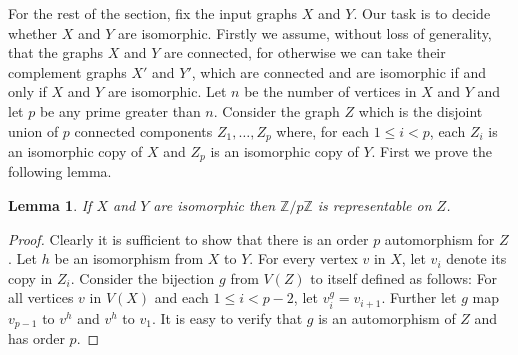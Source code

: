 \documentclass[a4paper,11pt]{article}
\newtheorem{lemma}[theorem]{Lemma}
\newcommand{\pcyc}{\mathbb{Z}/p\mathbb{Z}}
\begin{document}
For the rest of the section, fix the input graphs $X$ and $Y$. Our
task is to decide whether $X$ and $Y$ are isomorphic.  Firstly we
assume, without loss of generality, that the graphs $X$ and $Y$ are
connected, for otherwise we can take their complement graphs $X'$ and
$Y'$, which are connected and are isomorphic if and only if $X$ and
$Y$ are isomorphic. Let $n$ be the number of vertices in $X$ and $Y$
and let $p$ be any prime greater than $n$. Consider the graph $Z$
which is the disjoint union of $p$ connected components
$Z_1,\ldots,Z_p$ where, for each $1 \leq i < p$, each $Z_i$ is an
isomorphic copy of $X$ and $Z_p$ is an isomorphic copy of $Y$. First
we prove the following lemma.

\begin{lemma}\label{lem-gigrepf}
  If $X$ and $Y$ are isomorphic then $\pcyc$ is representable
  on $Z$.
\end{lemma}
\begin{proof}
  Clearly it is sufficient to show that there is an order $p$
  automorphism for $Z$. Let $h$ be an isomorphism from $X$ to $Y$. For
  every vertex $v$ in $X$, let $v_i$ denote its copy in
  $Z_i$. Consider the bijection $g$ from $V(Z)$ to itself defined as
  follows: For all vertices $v$ in $V(X)$ and each $1 \leq i < p - 2$,
  let $v_i^g = v_{i+1}$. Further let $g$ map $v_{p-1}$ to $v^h$ and
  $v^h$ to $v_1$. It is easy to verify that $g$ is an automorphism of
  $Z$ and has order $p$.
\end{proof}
\end{document}
